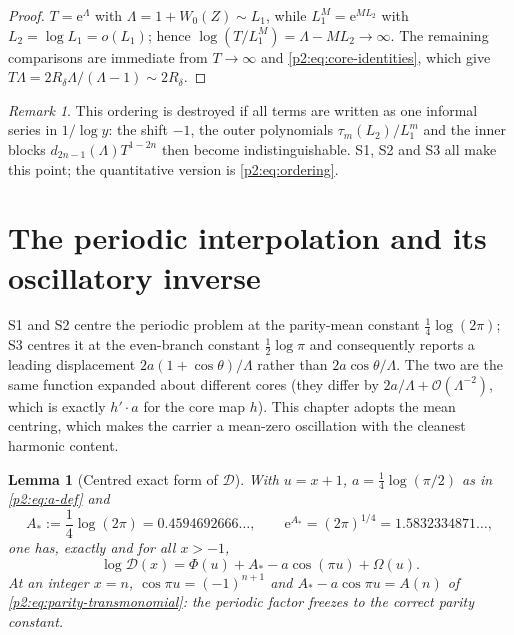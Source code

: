 \documentclass[11pt,a4paper,oneside]{book}
\theoremstyle{plain}
\newtheorem{lemma}[theorem]{Lemma}
\theoremstyle{definition}
\theoremstyle{remark}
\newtheorem{remark}[theorem]{Remark}
\newcommand{\e}{\mathrm{e}}
\newcommand{\bigO}{\mathcal{O}}
\newcommand{\littleo}{o}
\newcommand{\Wlam}{W}
\begin{document}
\begin{proof}
\(T=\e^{\Lambda}\) with \(\Lambda=1+\Wlam_0(Z)\sim L_1\), while
\(L_1^M=\e^{ML_2}\) with \(L_2=\log L_1=\littleo(L_1)\);
hence \(\log(T/L_1^M)=\Lambda-ML_2\to\infty\).  The remaining
comparisons are immediate from \(T\to\infty\) and
\cref{p2:eq:core-identities}, which give
\(T\Lambda=2R_\delta\Lambda/(\Lambda-1)\sim2R_\delta\).
\end{proof}

\begin{remark}
This ordering is destroyed if all terms are written as one informal series in
\(1/\log y\): the shift \(-1\), the outer polynomials \(\tau_m(L_2)/L_1^m\)
and the inner blocks \(d_{2n-1}(\Lambda)T^{1-2n}\) then become
indistinguishable.  \textsf{S1}, \textsf{S2} and \textsf{S3} all make this
point; the quantitative version is \cref{p2:eq:ordering}.
\end{remark}

\section{The periodic interpolation and its oscillatory inverse}
\label{p2:sec:oeis-inverse}

\begin{sourcebox}
\textsf{S1} and \textsf{S2} centre the periodic problem at the parity-mean
constant \(\tfrac14\log(2\pi)\); \textsf{S3} centres it at the even-branch
constant \(\tfrac12\log\pi\) and consequently reports a leading displacement
\(2a(1+\cos\theta)/\Lambda\) rather than \(2a\cos\theta/\Lambda\).  The two
are the same function expanded about different cores (they differ by
\(2a/\Lambda+\bigO(\Lambda^{-2})\), which is exactly \(h'\!\cdot a\) for the
core map \(h\)).  This chapter adopts the mean centring, which makes the
carrier a mean-zero oscillation with the cleanest harmonic content.
\end{sourcebox}

\begin{lemma}[Centred exact form of \(\mathscr D\)]
\label{p2:lem:oeis-centred}
With \(u=x+1\), \(a=\tfrac14\log(\pi/2)\) as in \cref{p2:eq:a-def} and
\begin{equation}
 A_*:=\frac14\log(2\pi)=0.4594692666\ldots,
 \qquad \e^{A_*}=(2\pi)^{1/4}=1.5832334871\ldots,
 \label{p2:eq:Astar}
\end{equation}
one has, exactly and for all \(x>-1\),
\begin{equation}
 \log\mathscr D(x)=\Phi(u)+A_*-a\cos(\pi u)+\Omega(u).
 \label{p2:eq:oeis-centred}
\end{equation}
At an integer \(x=n\), \(\cos\pi u=(-1)^{n+1}\) and
\(A_*-a\cos\pi u=A(n)\) of \cref{p2:eq:parity-transmonomial}: the periodic
factor freezes to the correct parity constant.
\end{lemma}
\end{document}
